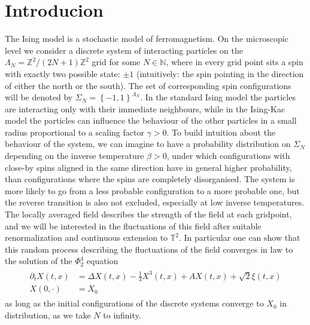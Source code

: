 \documentclass{report}
\newcommand{\ZZ}{\mathbb{Z}}
\newcommand{\NN}{\mathbb{N}}
\newcommand{\TT}{\mathbb{T}}
\theoremstyle{remark}
\theoremstyle{definition}
\begin{document}
\chapter{Introducion}
The Ising model is a stochastic model of ferromagnetism. On the microscopic level we consider a discrete system of interacting particles on the $\Lambda_N = \ZZ^2 / (2N+1)\ZZ^2$ grid for some $N \in \NN$, where in every grid point sits a spin with exactly two possible state: $\pm1$ (intuitively: the spin pointing in the direction of either the north or the south). The set of corresponding spin configurations will be denoted by $\Sigma_N = \left\{-1, 1\right\}^{\Lambda_N}$. In the standard Ising model the particles are interacting only with their immediate neighbours, while in the Ising-Kac model the particles can influence the behaviour of the other particles in a small radius proportional to a scaling factor $\gamma > 0$. To build intuition about the behaviour of the system, we can imagine to have a probability distribution on $\Sigma_N$ depending on the inverse temperature $\beta > 0$, under which configurations with close-by spins aligned in the same direction have in general higher probability, than configurations where the spins are completely disorganised. The system is more likely to go from a less probable configuration to a more probable one, but the reverse transition is also not excluded, especially at low inverse temperatures. The locally averaged field describes the strength of the field at each gridpoint, and we will be interested in the fluctuations of this field after suitable renormalization and continuous extension to $\TT^2$. In particular one can show that this random process describing the fluctuations of the field converges in law to the solution of the $\Phi^4_2$ equation 
\begin{align}
  \label{eq:phi_4_2}
  \begin{split}
  \partial_t X(t, x) &= \Delta X(t, x) - \frac{1}{3}X^3(t, x) + A X(t, x) + \sqrt{2}\xi(t, x)\\
  X(0, \cdot) &= X_0\,    
  \end{split}
\end{align}
as long as the initial configurations of the discrete systems converge to $X_0$ in distribution, as we take $N$ to infinity.
\end{document}
